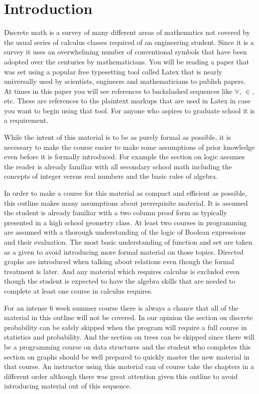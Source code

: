 
\chapter* {Introduction}
Discrete math is a survey of many different areas of mathematics not covered by the usual series of calculus classes required of an engineering student. Since it is a survey it uses an overwhelming number of conventional symbols that have been adopted over the centuries by mathematicians. You will be reading a paper that was set using a popular free typesetting tool called Latex that is nearly universally used by scientists, engineers and mathematicians to publish papers. At times in this paper you will see references to backslashed sequences like $\forall$, $\in$, etc. These are references to the plaintext markups that are used in Latex in case you want to begin using that tool. For anyone who aspires to graduate school it is a requirement.


While the intent of this material is to be as purely formal as possible, it is necessary to make the course easier to make some assumptions of prior knowledge even before it is formally introduced. For example the section on logic assumes the reader is already familiar with all secondary school math including the concepts of integer versus real numbers and the basic rules of algebra.

In order to make a course for this material as compact and efficient as possible, this outline makes many assumptions about prerequisite material. It is assumed the student is already familiar with a two column proof form as typically presented in a high school geometry class. At least two courses in programming are assumed with a thorough understanding of the logic of Boolean expressions and their evaluation. The most basic understanding of function and set are taken as a given to avoid introducing more formal material on those topics. Directed graphs are introduced when talking about relations even though the formal treatment is later. And any material which requires calculus is excluded even though the student is expected to have the algebra skills that are needed to complete at least one course in calculus requires.

For an intense 6 week summer course there is always a chance that all of the material in this outline will not be covered. In our opinion the section on discrete probability can be safely skipped when the program will require a full course in statistics and probability. And the section on trees can be skipped since there will be a programming course on data structures and the student who completes this section on graphs should be well prepared to quickly master the new material in that course. An instructor using this material can of course take the chapters in a different order although there was great attention given this outline to avoid introducing material out of this sequence. 

